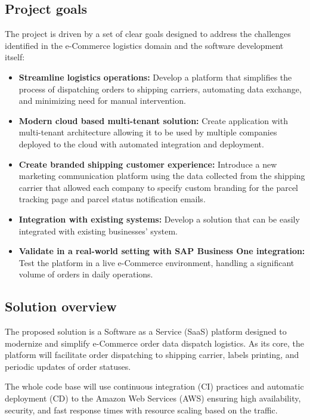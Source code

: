 \subsection*{Project goals}
\label{subsec:project-goals}
The project is driven by a set of clear goals designed to address the challenges identified in the e-Commerce logistics domain and the software development itself:
\begin{itemize}
    \item \textbf{Streamline logistics operations:} Develop a platform that simplifies the process of dispatching orders to shipping carriers, automating data exchange, and minimizing need for manual intervention.
    \item \textbf{Modern cloud based multi-tenant solution:} Create application with multi-tenant architecture allowing it to be used by multiple companies deployed to the cloud with automated integration and deployment. 
    \item \textbf{Create branded shipping customer experience:} Introduce a new marketing communication platform using the data collected from the shipping carrier that allowed each company to specify custom branding for the parcel tracking page and parcel status notification emails.
    \item \textbf{Integration with existing systems:} Develop a solution that can be easily integrated with existing businesses' system.
    \item \textbf{Validate in a real-world setting with SAP Business One integration:} Test the platform in a live e-Commerce environment, handling a significant volume of orders in daily operations.
\end{itemize}

\subsection*{Solution overview}
\label{subsec:solution-overview}
The proposed solution is a Software as a Service (\ac{SaaS}) platform designed to modernize and simplify e-Commerce order data dispatch logistics. As its core, the platform will facilitate order dispatching to shipping carrier, labels printing, and periodic updates of order statuses. 

The whole code base will use continuous integration (\ac{CI}) practices and automatic deployment (\ac{CD}) to the Amazon Web Services (\ac{AWS}) ensuring high availability, security, and fast response times with resource scaling based on the traffic.

